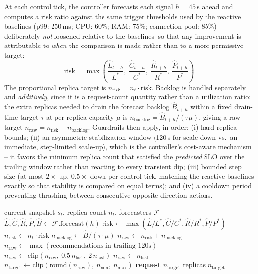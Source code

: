 \documentclass[conference]{IEEEtran}
\begin{document}
At each control tick, the controller forecasts each signal $h=45$\,s ahead and computes a risk ratio
against the same trigger thresholds used by the reactive baselines (p99: 250\,ms; CPU: 60\%; RAM: 75\%;
connection pool: 85\%) -- deliberately \emph{not} loosened relative to the baselines, so that any
improvement is attributable to \emph{when} the comparison is made rather than to a more permissive
target:
\begin{equation}
\mathrm{risk} = \max\!\left(\frac{\hat{L}_{t+h}}{L^{*}},\ \frac{\hat{C}_{t+h}}{C^{*}},\ \frac{\hat{R}_{t+h}}{R^{*}},\ \frac{\hat{P}_{t+h}}{P^{*}}\right)
\end{equation}
The proportional replica target is $n_{\mathrm{risk}} = n_t \cdot \mathrm{risk}$. Backlog is handled
separately and \emph{additively}, since it is a request-count quantity rather than a utilization ratio:
the extra replicas needed to drain the forecast backlog $\hat{B}_{t+h}$ within a fixed drain-time
target $\tau$ at per-replica capacity $\mu$ is $n_{\mathrm{backlog}} = \hat{B}_{t+h}/(\tau\mu)$, giving
a raw target $n_{\mathrm{raw}} = n_{\mathrm{risk}} + n_{\mathrm{backlog}}$. Guardrails then apply, in
order: (i) hard replica bounds; (ii) an asymmetric stabilization window (120\,s for scale-down vs.\ an
immediate, step-limited scale-up), which is the controller's cost-aware mechanism -- it favors the
minimum replica count that satisfied the \emph{predicted} SLO over the trailing window rather than
reacting to every transient dip; (iii) bounded step size (at most $2\times$ up, $0.5\times$ down per
control tick, matching the reactive baselines exactly so that stability is compared on equal terms);
and (iv) a cooldown period preventing thrashing between consecutive opposite-direction actions.

\begin{algorithm}[t]
\caption{Proactive Multi-Signal Decision Pipeline (one control tick)}
\label{alg:pipeline}
\begin{algorithmic}[1]
\Require current snapshot $s_t$, replica count $n_t$, forecasters $\mathcal{F}$
\State $\hat L, \hat C, \hat R, \hat P, \hat B \gets \mathcal{F}.\text{forecast}(h)$ 
\State $\mathrm{risk} \gets \max(\hat L/L^{*}, \hat C/C^{*}, \hat R/R^{*}, \hat P/P^{*})$
\State $n_{\mathrm{risk}} \gets n_t \cdot \mathrm{risk}$
\State $n_{\mathrm{backlog}} \gets \hat B / (\tau \cdot \mu)$
\State $n_{\mathrm{raw}} \gets n_{\mathrm{risk}} + n_{\mathrm{backlog}}$
 
  \State $n_{\mathrm{raw}} \gets \max(\text{recommendations in trailing } 120\text{s})$
\EndIf
\State $n_{\mathrm{raw}} \gets \mathrm{clip}(n_{\mathrm{raw}},\ 0.5\,n_{\mathrm{last}},\ 2\,n_{\mathrm{last}})$
  \State $n_{\mathrm{raw}} \gets n_{\mathrm{last}}$ 
\EndIf
\State $n_{\mathrm{target}} \gets \mathrm{clip}(\mathrm{round}(n_{\mathrm{raw}}),\ n_{\min},\ n_{\max})$
\State \textbf{request} $n_{\mathrm{target}}$ replicas 
\State \Return $n_{\mathrm{target}}$
\end{algorithmic}
\end{algorithm}
\end{document}
